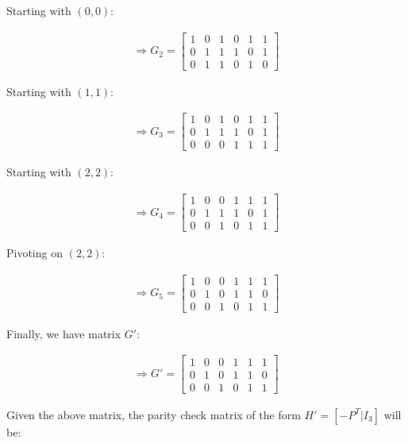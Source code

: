 \documentclass{article}
\begin{document}
Starting with $(0,0)$:

\begin{align*}
  \Rightarrow G_2=\begin{bmatrix}
    1 & 0 & 1 & 0 & 1 & 1\\
    0 & 1 & 1 & 1 & 0 & 1\\
    0 & 1 & 1 & 0 & 1 & 0
  \end{bmatrix}
\end{align*}

Starting with $(1,1)$:

\begin{align*}
  \Rightarrow G_3=\begin{bmatrix}
    1 & 0 & 1 & 0 & 1 & 1\\
    0 & 1 & 1 & 1 & 0 & 1\\
    0 & 0 & 0 & 1 & 1 & 1
  \end{bmatrix}
\end{align*}

Starting with $(2,2)$:

\begin{align*}
  \Rightarrow G_4=\begin{bmatrix}
    1 & 0 & 0 & 1 & 1 & 1\\
    0 & 1 & 1 & 1 & 0 & 1\\
    0 & 0 & 1 & 0 & 1 & 1
  \end{bmatrix}
\end{align*}

Pivoting on $(2,2)$:

\begin{align*}
  \Rightarrow G_5=\begin{bmatrix}
    1 & 0 & 0 & 1 & 1 & 1\\
    0 & 1 & 0 & 1 & 1 & 0\\
    0 & 0 & 1 & 0 & 1 & 1
  \end{bmatrix}
\end{align*}

Finally, we have matrix $G'$:

\begin{align*}
  \Rightarrow G'=\begin{bmatrix}
    1 & 0 & 0 & 1 & 1 & 1\\
    0 & 1 & 0 & 1 & 1 & 0\\
    0 & 0 & 1 & 0 & 1 & 1
  \end{bmatrix}
\end{align*}

Given the above matrix, the parity check matrix of the form $H'=[-P^T|I_3]$
will be:
\end{document}
